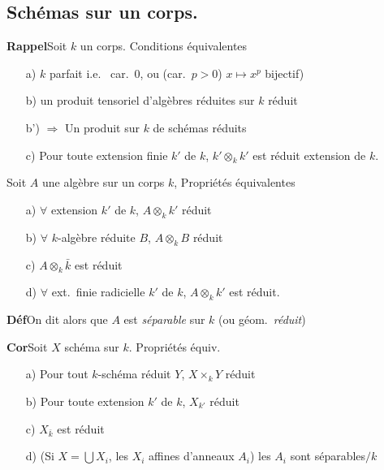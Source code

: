 \documentclass[11pt,a4paper]{article}
\begin{document}
\subsection*{Schémas sur un corps.}
 


\textbf{Rappel}\quad Soit $k$ un corps. Conditions équivalentes
\begin{itemize}
  \item[a)] $k$ parfait i.e.\ \struck{\ill{}} car.\ 0, ou (car.\ $p > 0$)
    $x \mapsto x^p$ bijectif)
  \item[b)] un produit tensoriel d'algèbres réduites sur $k$  réduit
  \item[b')] $\Longrightarrow$ Un produit sur $k$ de schémas réduits
     
  \item[c)] Pour toute extension finie $k'$ de $k$,
    \struck{\ill{}} $k' \otimes_k k'$ est réduit \ill{} extension
     de $k$.
\end{itemize}

Soit $A$ une algèbre sur un corps $k$, Propriétés équivalentes
\begin{itemize}
  \item[a)] $\forall$ extension $k'$ de $k$, $A \otimes_k k'$ réduit
  \item[b)] $\forall$ $k$-algèbre réduite $B$, $A \otimes_k B$ réduit
  \item[c)] $A \otimes_k \bar k$ est réduit
  \item[d)] $\forall$ ext.\ finie radicielle \struck{\ill{}} $k'$ de $k$,
    $A \otimes_k k'$ est réduit.
\end{itemize}

\textbf{Déf}\quad On dit alors que $A$ est \emph{séparable} sur $k$ (ou
géom.\ \emph{réduit})

\textbf{Cor}\quad Soit $X$ schéma sur $k$. Propriétés équiv.
\begin{itemize}
  \item[a)] \struck{\ill{}} Pour tout $k$-schéma réduit $Y$, $X \times_k Y$ réduit
  \item[b)] Pour toute \struck{\ill{}} extension $k'$ de $k$, $X_{k'}$ réduit
  \item[c)] $X_{\bar k}$ est réduit
  \item[d)] (Si $X = \bigcup X_i$, les $X_i$ affines d'anneaux $A_i$) les
    $A_i$ sont séparables$/k$
\end{itemize}
\end{document}
